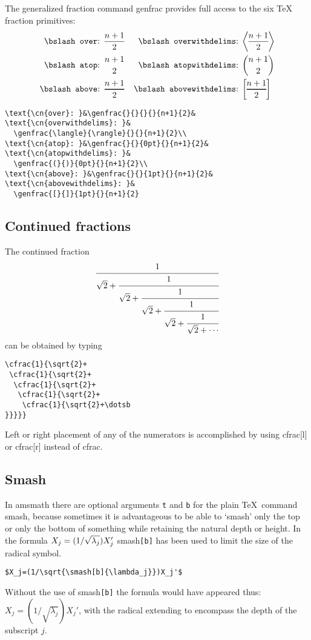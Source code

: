 \documentclass[mlq,fleqn]{w-art}
\newcommand{\ntt}{\normalfont\ttfamily}
\newcommand{\cn}[1]{{\protect\ntt\bslash#1}}
\newcommand{\pkg}[1]{{\protect\ntt#1}}
\begin{document}
The generalized fraction command \cn{genfrac} provides full access to
the six \TeX{} fraction primitives:
\begin{align}
\text{\cn{over}: }&\genfrac{}{}{}{}{n+1}{2}&
\text{\cn{overwithdelims}: }&
  \genfrac{\langle}{\rangle}{}{}{n+1}{2}\\
\text{\cn{atop}: }&\genfrac{}{}{0pt}{}{n+1}{2}&
\text{\cn{atopwithdelims}: }&
  \genfrac{(}{)}{0pt}{}{n+1}{2}\\
\text{\cn{above}: }&\genfrac{}{}{1pt}{}{n+1}{2}&
\text{\cn{abovewithdelims}: }&
  \genfrac{[}{]}{1pt}{}{n+1}{2}
\end{align}
\begin{verbatim}
\text{\cn{over}: }&\genfrac{}{}{}{}{n+1}{2}&
\text{\cn{overwithdelims}: }&
  \genfrac{\langle}{\rangle}{}{}{n+1}{2}\\
\text{\cn{atop}: }&\genfrac{}{}{0pt}{}{n+1}{2}&
\text{\cn{atopwithdelims}: }&
  \genfrac{(}{)}{0pt}{}{n+1}{2}\\
\text{\cn{above}: }&\genfrac{}{}{1pt}{}{n+1}{2}&
\text{\cn{abovewithdelims}: }&
  \genfrac{[}{]}{1pt}{}{n+1}{2}
\end{verbatim}

\subsection{Continued fractions}
The continued fraction
\begin{equation}
\cfrac{1}{\sqrt{2}+
 \cfrac{1}{\sqrt{2}+
  \cfrac{1}{\sqrt{2}+
   \cfrac{1}{\sqrt{2}+
    \cfrac{1}{\sqrt{2}+\dotsb
}}}}}
\end{equation}
can be obtained by typing
\begin{verbatim}
\cfrac{1}{\sqrt{2}+
 \cfrac{1}{\sqrt{2}+
  \cfrac{1}{\sqrt{2}+
   \cfrac{1}{\sqrt{2}+
    \cfrac{1}{\sqrt{2}+\dotsb
}}}}}
\end{verbatim}
Left or right placement of any of the numerators is accomplished by using
\cn{cfrac[l]} or \cn{cfrac[r]} instead of \cn{cfrac}.

\subsection{Smash}

In \pkg{amsmath} there are optional arguments \verb"t" and \verb"b" for
the plain \TeX\ command \cn{smash}, because sometimes it is advantageous
to be able to `smash' only the top or only the bottom of something while
retaining the natural depth or height. In the formula
$X_j=(1/\sqrt{\smash[b]{\lambda_j}})X_j'$ \cn{smash}\verb=[b]= has been
used to limit the size of the radical symbol.
\begin{verbatim}
$X_j=(1/\sqrt{\smash[b]{\lambda_j}})X_j'$
\end{verbatim}
Without the use of \cn{smash}\verb=[b]= the formula would have appeared
thus: $X_j=(1/\sqrt{\lambda_j})X_j'$, with the radical extending to
encompass the depth of the subscript $j$.
\end{document}
